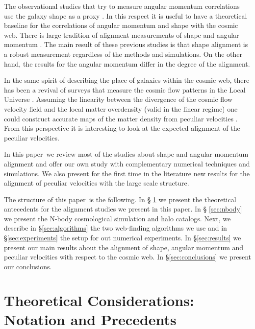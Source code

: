 \documentclass[useAMS,usenatbib]{mn2e}
\newcommand{\documentname}{paper~}
\begin{document}
The observational studies that try to measure angular momentum correlations
use the galaxy shape as a proxy  \citep{Lee2002,Lee2007,Jones2010,Paz2008}. In
this respect it is useful to have a theoretical baseline for the
correlations of angular momentum and shape with the cosmic web.  There
is large tradition of alignment measurements of shape and angular momentum
\citep[e.g.][]{Hahn2007,AragonCalvo2007,Zhang2009,Paz2010,Codis2012,Trowland2013,Libeskind2013,AragonCalvo2014}. The
main result of these previous studies is that shape alignment is a
robust measurement regardless of the methods and simulations. On the
other hand, the results for the angular momentum differ in the degree
of the alignment.  

In the same spirit of describing the place of galaxies within the
cosmic web, there has been a revival of surveys that measure the
cosmic flow patterns in the Local Universe
\citep{Nusser2011,Tully2013}. Assuming the linearity between the
divergence of the cosmic flow velocity field and the local matter
overdensity (valid in the linear regime) one could construct accurate
maps of the matter density from peculiar velocities
\citep{Courtois2012}. From this perspective it is interesting to look
at the expected alignment of the peculiar velocities.

In this \documentname we review most of the studies about shape and
angular momentum alignment and offer our own study with complementary
numerical techniques and simulations.  We also present for the first
time in the literature new results for the alignment of peculiar
velocities with the large scale structure.

The structure of this \documentname is the following. In \S
\ref{sec:theory} we present the theoretical antecedents for the
alignment studies we present in this paper. In \S
\ref{sec:nbody} we present the N-body
cosmological simulation and halo catalogs.  Next, we describe in
\S\ref{sec:algorithms} the two web-finding algorithms we use and in
\S\ref{sec:experiments} the setup for out numerical experiments. In
\S\ref{sec:results} we present our main results about the alignment
of shape, angular momentum and peculiar velocities with respect to the cosmic
web. In \S\ref{sec:conclusions} we present our conclusions.


\section{Theoretical Considerations: Notation and Precedents}
\label{sec:theory}
\end{document}
